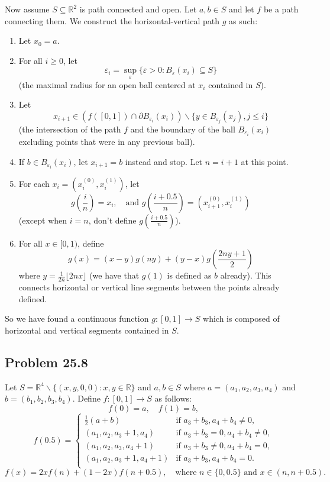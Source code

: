 \documentclass{article}
\newcommand{\R}{\mathbb{R}}
\newcommand{\eps}{\varepsilon}
\newcommand{\lb}{\left(}
\newcommand{\rb}{\right)}
\newcommand{\minus}{\backslash}
\begin{document}
Now assume $S \subseteq \R^2$ is path connected and open. Let $a, b \in S$ and let $f$ be a path connecting them. We construct the horizontal-vertical path $g$ as such:

\begin{enumerate}
    \item Let $x_0 = a$.
    \item For all $i \ge 0$, let
    $$\eps_i = \sup_\eps \{\eps > 0 : B_\eps(x_i) \subseteq S\}$$
    (the maximal radius for an open ball centered at $x_i$ contained in $S$).
    \item Let
    $$x_{i + 1} \in (f([0, 1]) \cap \partial B_{\eps_i}(x_i)) \minus \{y \in B_{\eps_j}(x_j), j \le i\}$$
    (the intersection of the path $f$ and the boundary of the ball $B_{\eps_i}(x_i)$ excluding points that were in any previous ball).
    \item If $b \in B_{\eps_i}(x_i)$, let $x_{i + 1} = b$ instead and stop. Let $n = i + 1$ at this point.
    \item For each $x_i = (x_i^{(0)}, x_i^{(1)})$, let
    $$g\lb\frac{i}{n}\rb = x_i,\quad \text{and } g\lb\frac{i + 0.5}{n}\rb = (x_{i + 1}^{(0)}, x_i^{(1)})$$
    (except when $i = n$, don't define $g\lb\frac{i + 0.5}{n}\rb$).
    \item For all $x \in [0, 1)$, define
    $$g(x) = (x - y)g(ny) + (y - x)g\lb\frac{2ny+1}{2}\rb$$
    where $y = \frac{1}{2n}\lfloor 2nx\rfloor$ (we have that $g(1)$ is defined as $b$ already). This connects horizontal or vertical line segments between the points already defined.
\end{enumerate}

So we have found a continuous function $g: [0, 1] \to S$ which is composed of horizontal and vertical segments contained in $S$.

\subsection*{Problem 25.8}
Let $S = \R^4 \minus \{(x, y, 0, 0): x, y \in \R\}$ and $a, b \in S$ where $a = (a_1, a_2, a_3, a_4)$ and $b = (b_1, b_2, b_3, b_4)$. Define $f: [0, 1] \to S$ as follows:
$$f(0) = a, \quad f(1) = b,$$
$$f(0.5) = \begin{cases}
    \frac{1}{2}(a + b) & \text{if } a_3 + b_3, a_4 + b_4 \neq 0,\\
    (a_1, a_2, a_3 + 1, a_4) & \text{if } a_3 + b_3 = 0, a_4 + b_4 \neq 0,\\
    (a_1, a_2, a_3, a_4 + 1) & \text{if } a_3 + b_3 \neq 0, a_4 + b_4 = 0,\\
    (a_1, a_2, a_3 + 1, a_4 + 1) & \text{if } a_3 + b_3, a_4 + b_4 = 0.\\
\end{cases}$$
$$f(x) = 2xf(n) + (1 - 2x)f(n + 0.5),\quad \text{where } n \in \{0, 0.5\} \text{ and } x \in (n, n + 0.5).$$
\end{document}
